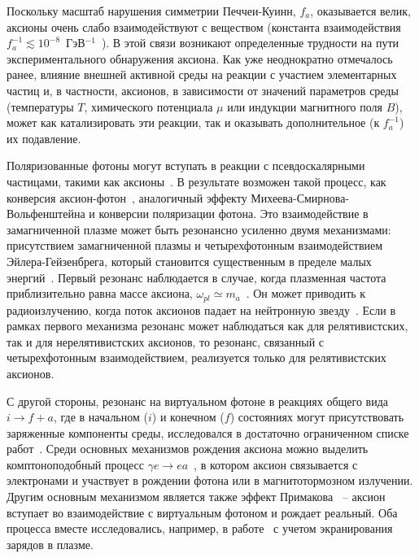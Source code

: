 Поскольку масштаб нарушения симметрии Печчеи-Куинн, $f_a$, оказывается велик, аксионы очень слабо взаимодействуют с веществом (константа взаимодействия $f_a^{-1} \lesssim 10^{-8}$\, ГэВ$^{-1}$~\cite{Raffelt:1996}). В этой связи возникают определенные трудности на пути экспериментального обнаружения аксиона. Как уже неоднократно отмечалось ранее, влияние внешней активной среды на реакции с участием элементарных частиц и, в частности,  аксионов, в зависимости от значений параметров среды (температуры  $T$, химического потенциала  $\mu$ или индукции магнитного поля  $B$), может как катализировать эти реакции, так и оказывать дополнительное (к $f_a^{-1}$) их подавление.

Поляризованные фотоны могут вступать в реакции с псевдоскалярными частицами, такими как аксионы~\cite{Sikivie:1983}. В результате возможен такой процесс, как конверсия аксион-фотон~\cite{Raffelt:1988}, аналогичный эффекту Михеева-Смирнова-Вольфенштейна и конверсии поляризации фотона. Это взаимодействие в замагниченной плазме может быть резонансно усиленно двумя механизмами: присутствием замагниченной плазмы и четырехфотонным взаимодействием Эйлера-Гейзенбрега, который становится существенным в пределе малых энергий~\cite{Lai:2006}. Первый резонанс наблюдается в случае, когда плазменная частота приблизительно равна массе аксиона, $\omega_{pl}\simeq m_a$~\cite{Yanagida:1988}. Он может приводить к радиоизлучению, когда поток аксионов падает на нейтронную звезду~\cite{Pshirkov:2009}. Если в рамках первого механизма резонанс может наблюдаться как для релятивистских, так и для нерелятивистских аксионов, то резонанс, связанный с четырехфотонным взаимодействием, реализуется только для релятивистских аксионов.

С другой стороны, резонанс на виртуальном фотоне в реакциях общего вида $i \to f + a$, где в начальном ($i$) и конечном ($f$) состояниях могут присутствовать заряженные компоненты среды, исследовался в достаточно ограниченном списке работ~\cite{Skobelev:2000,Skobelev:2007,MikhRumShk:09}. Среди основных механизмов рождения аксиона можно выделить комптоноподобный процесс $\gamma e \to e a$~\cite{Skobelev:2000}, в котором аксион связывается с электронами и участвует в рождении фотона или в магнитотормозном излучении. Другим основным механизмом является также эффект Примакова~\cite{Primakoff:1951} -- аксион вступает во взаимодействие с виртуальным фотоном и рождает реальный. Оба процесса вместе исследовались, например, в работе~\cite{Raffelt:1996} с учетом экранирования зарядов в плазме.

